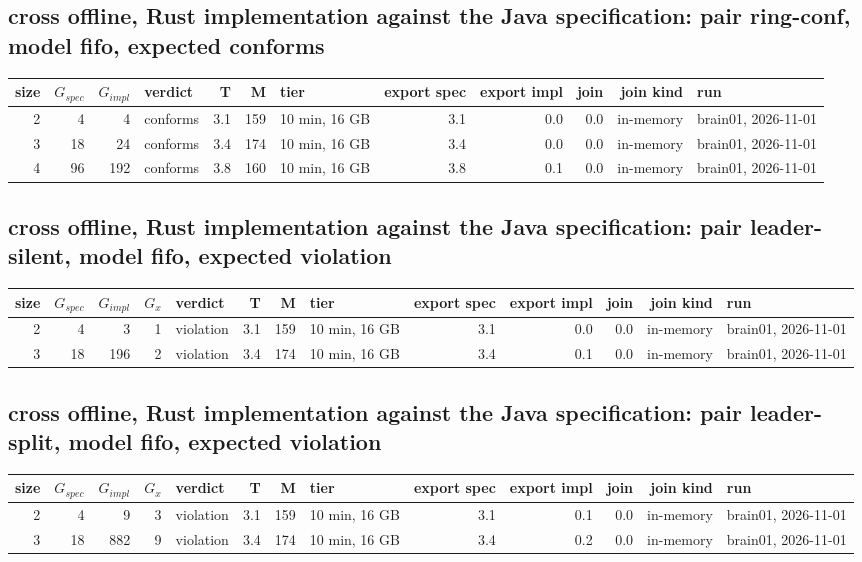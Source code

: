 \documentclass[10pt]{article}
\begin{document}
\subsection*{cross offline, Rust implementation against the Java specification: pair \textsf{ring-conf}, model fifo, expected conforms}
\begin{longtable}{@{}rrrlrrlrrrrl@{}}
\toprule
size & $G_{\mathit{spec}}$ & $G_{\mathit{impl}}$ & verdict & T & M & tier & export spec & export impl & join & join kind & run \\
\midrule
\endhead
\color{red} 2 & 4 & 4 & conforms & 3.1 & 159 & 10 min, 16 GB & 3.1 & 0.0 & 0.0 & in-memory & brain01, 2026-11-01 \\
\color{red} 3 & 18 & 24 & conforms & 3.4 & 174 & 10 min, 16 GB & 3.4 & 0.0 & 0.0 & in-memory & brain01, 2026-11-01 \\
\color{red} 4 & 96 & 192 & conforms & 3.8 & 160 & 10 min, 16 GB & 3.8 & 0.1 & 0.0 & in-memory & brain01, 2026-11-01 \\
\bottomrule
\end{longtable}
\subsection*{cross offline, Rust implementation against the Java specification: pair \textsf{leader-silent}, model fifo, expected violation}
\begin{longtable}{@{}rrrrlrrlrrrrl@{}}
\toprule
size & $G_{\mathit{spec}}$ & $G_{\mathit{impl}}$ & $G_x$ & verdict & T & M & tier & export spec & export impl & join & join kind & run \\
\midrule
\endhead
\color{red} 2 & 4 & 3 & 1 & violation & 3.1 & 159 & 10 min, 16 GB & 3.1 & 0.0 & 0.0 & in-memory & brain01, 2026-11-01 \\
\color{red} 3 & 18 & 196 & 2 & violation & 3.4 & 174 & 10 min, 16 GB & 3.4 & 0.1 & 0.0 & in-memory & brain01, 2026-11-01 \\
\bottomrule
\end{longtable}
\subsection*{cross offline, Rust implementation against the Java specification: pair \textsf{leader-split}, model fifo, expected violation}
\begin{longtable}{@{}rrrrlrrlrrrrl@{}}
\toprule
size & $G_{\mathit{spec}}$ & $G_{\mathit{impl}}$ & $G_x$ & verdict & T & M & tier & export spec & export impl & join & join kind & run \\
\midrule
\endhead
\color{red} 2 & 4 & 9 & 3 & violation & 3.1 & 159 & 10 min, 16 GB & 3.1 & 0.1 & 0.0 & in-memory & brain01, 2026-11-01 \\
\color{red} 3 & 18 & 882 & 9 & violation & 3.4 & 174 & 10 min, 16 GB & 3.4 & 0.2 & 0.0 & in-memory & brain01, 2026-11-01 \\
\bottomrule
\end{longtable}
\end{document}
